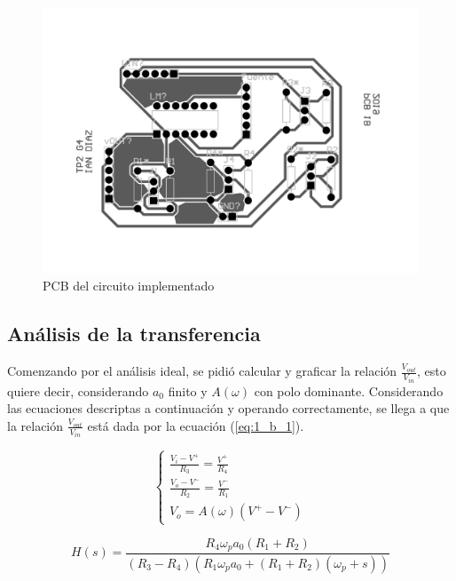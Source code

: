 \begin{figure}[H]
\begin{centering}
\includegraphics[scale=0.3]{../Ex1/iB/Resources1b/PCB}
\par\end{centering}
\caption{PCB del circuito implementado}
\label{1_b_3}

\end{figure}

\subsection{Análisis de la transferencia}

Comenzando por el análisis ideal, se pidió calcular y graficar la
relación $\frac{V_{out}}{V_{in}}$, esto quiere decir, considerando
$a_{0}$ finito y $A(\omega)$ con polo dominante. Considerando las
ecuaciones descriptas a continuación y operando correctamente, se
llega a que la relación $\frac{V_{out}}{V_{in}}$ está dada por la
ecuación (\ref{eq:1_b_1}).

\[
\left\{ \begin{array}{c}
\frac{V_{i}-V^{+}}{R_{3}}=\frac{V^{+}}{R_{4}}\\
\frac{V_{o}-V^{-}}{R_{2}}=\frac{V^{-}}{R_{1}}\\
V_{o}=A(\omega)(V^{+}-V^{-})
\end{array}\right.
\]

\begin{equation}
H(s)=\frac{R_{4}\omega_{p}a_{0}\left(R_{1}+R_{2}\right)}{\left(R_{3}-R_{4}\right)\left(R_{1}\omega_{p}a_{0}+\left(R_{1}+R_{2}\right)\left(\omega_{p}+s\right)\right)}\label{eq:1_b_1}
\end{equation}


